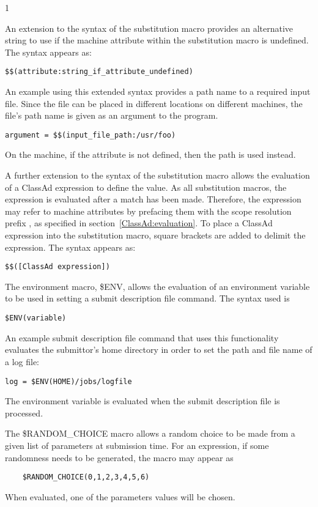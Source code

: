 \begin{ManPage}{\label{man-condor-submit}}{1}
\begin{description}
An extension to the syntax of the substitution macro provides an
alternative string to use if the machine attribute within the
substitution macro is undefined.
The syntax appears as:
\begin{verbatim} 
$$(attribute:string_if_attribute_undefined)
\end{verbatim}

An example using this extended syntax provides a path name to a
required input file.
Since the file can be placed in different locations on
different machines, the file's path name is given as an argument
to the program.
\begin{verbatim} 
argument = $$(input_file_path:/usr/foo)
\end{verbatim}
On the machine, if the attribute  is not
defined, then the path  is used instead.

A further extension to the syntax of the substitution macro allows the
evaluation of a ClassAd expression to define the value.
As all substitution macros, the expression is evaluated after
a match has been made.
Therefore, the expression may refer to machine attributes
by prefacing them with the scope resolution prefix ,
as specified in section~\ref{ClassAd:evaluation}.
To place a ClassAd expression into the substitution macro,
square brackets are added to delimit the expression.
The syntax appears as:
\begin{verbatim} 
$$([ClassAd expression])
\end{verbatim}

The environment macro, \$ENV, allows the evaluation of an environment
variable to be used in setting a submit description file command.
The syntax used is
\begin{verbatim} 
$ENV(variable)
\end{verbatim}
An example submit description file command that uses this functionality
evaluates the submittor's home directory in order to set the
path and file name of a log file:
\begin{verbatim} 
log = $ENV(HOME)/jobs/logfile
\end{verbatim}
The environment variable is evaluated when the submit description
file is processed.

The \$RANDOM\_CHOICE macro allows a random choice to be made
from a given list of parameters at submission time.
For an expression, if some randomness needs to be generated,
the macro may appear as
\begin{verbatim} 
    $RANDOM_CHOICE(0,1,2,3,4,5,6)
\end{verbatim}
When evaluated, one of the parameters values will be chosen. 


\end{description}
\end{ManPage}
